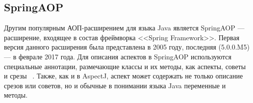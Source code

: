 \documentclass[conference]{IEEEtran}
\begin{document}

\subsection{SpringAOP}

Другим популярным АОП-расширением для языка Java является SpringAOP ---
расширение, входящее в состав фреймворка <<Spring Framework>>.
Первая версия данного расширения была представлена в 2005 году, последняя
(5.0.0.M5) --- в феврале 2017 года.
Для описания аспектов в SpringAOP используются специальные аннотации,
размечающие классы и их методы, как аспекты, советы и срезы
~\cite{springAOP_doc}.
Также, как и в AspectJ, аспект может содержать не только описание срезов или
советов, но и обычные в понимании языка Java переменные и методы.

\end{document}

